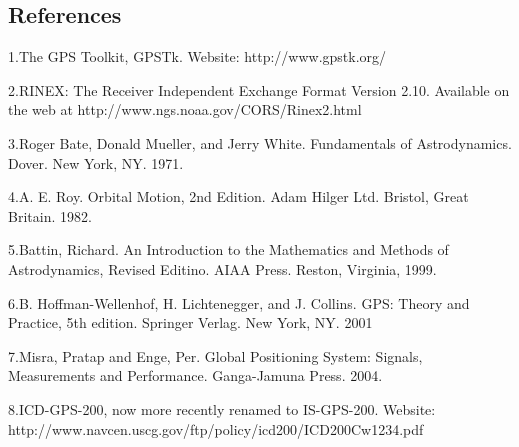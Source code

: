 \subsection{References}

1.The GPS Toolkit, GPSTk.  Website: http://www.gpstk.org/

2.RINEX: The Receiver Independent Exchange Format Version 2.10.  Available on the web at    
 	http://www.ngs.noaa.gov/CORS/Rinex2.html

3.Roger Bate, Donald Mueller, and Jerry White. Fundamentals of Astrodynamics. Dover. New York, NY. 1971.

4.A. E. Roy. Orbital Motion, 2nd Edition. Adam Hilger Ltd. Bristol, Great Britain. 1982.

5.Battin, Richard. An Introduction to the Mathematics and Methods of Astrodynamics, Revised Editino. AIAA Press. Reston, Virginia, 1999.

6.B. Hoffman-Wellenhof, H. Lichtenegger, and J. Collins. GPS: Theory and Practice, 5th edition. Springer Verlag.  New York, NY. 2001

7.Misra, Pratap and Enge, Per. Global Positioning System: Signals, Measurements and Performance.  Ganga-Jamuna Press. 2004.

8.ICD-GPS-200, now more recently renamed to IS-GPS-200. Website: http://www.navcen.uscg.gov/ftp/policy/icd200/ICD200Cw1234.pdf